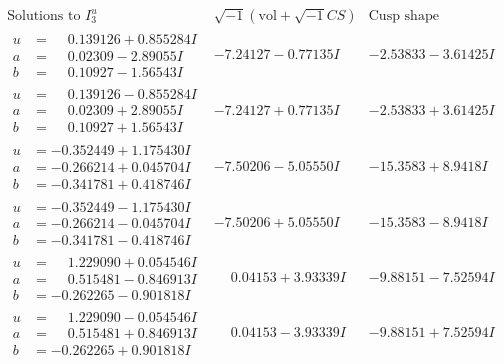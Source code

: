 \documentclass[1p]{elsarticle_modified}
\theoremstyle{definition}
\newcommand{\I}{\sqrt{-1}}
\begin{document}
$$\begin{array}{c|c|c}  
\text{Solutions to }I^u_{3}& \I (\text{vol} + \sqrt{-1}CS) & \text{Cusp shape}\\
 \hline 
\begin{aligned}
u &= \phantom{-}0.139126 + 0.855284 I \\
a &= \phantom{-}0.02309 - 2.89055 I \\
b &= \phantom{-}0.10927 - 1.56543 I\end{aligned}
 & -7.24127 - 0.77135 I & -2.53833 - 3.61425 I \\ \hline\begin{aligned}
u &= \phantom{-}0.139126 - 0.855284 I \\
a &= \phantom{-}0.02309 + 2.89055 I \\
b &= \phantom{-}0.10927 + 1.56543 I\end{aligned}
 & -7.24127 + 0.77135 I & -2.53833 + 3.61425 I \\ \hline\begin{aligned}
u &= -0.352449 + 1.175430 I \\
a &= -0.266214 + 0.045704 I \\
b &= -0.341781 + 0.418746 I\end{aligned}
 & -7.50206 - 5.05550 I & -15.3583 + 8.9418 I \\ \hline\begin{aligned}
u &= -0.352449 - 1.175430 I \\
a &= -0.266214 - 0.045704 I \\
b &= -0.341781 - 0.418746 I\end{aligned}
 & -7.50206 + 5.05550 I & -15.3583 - 8.9418 I \\ \hline\begin{aligned}
u &= \phantom{-}1.229090 + 0.054546 I \\
a &= \phantom{-}0.515481 - 0.846913 I \\
b &= -0.262265 - 0.901818 I\end{aligned}
 & \phantom{-}0.04153 + 3.93339 I & -9.88151 - 7.52594 I \\ \hline\begin{aligned}
u &= \phantom{-}1.229090 - 0.054546 I \\
a &= \phantom{-}0.515481 + 0.846913 I \\
b &= -0.262265 + 0.901818 I\end{aligned}
 & \phantom{-}0.04153 - 3.93339 I & -9.88151 + 7.52594 I \\ \hline\begin{aligned}

\end{aligned}
\end{array}$$
\end{document}
